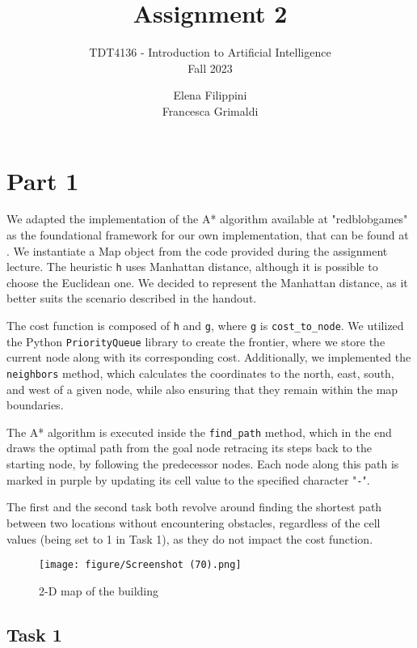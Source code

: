 \documentclass{article}
\title{%
    \huge Assignment 2}
\subtitle{%
    TDT4136 - Introduction to Artificial Intelligence\\
    Fall 2023
    }
\author{%
  Elena Filippini\\
  Francesca Grimaldi
}
\date{}
\begin{document}
\maketitle




\section{Part 1}
    We adapted the implementation of the A* algorithm available at "redblobgames" as the foundational framework for our own implementation, that can be found at \cite{red}.
    We instantiate a Map object from the code provided during the assignment lecture.
    The heuristic \texttt{h} uses Manhattan distance, although it is possible to choose the Euclidean one.
    We decided to represent the Manhattan distance, as it better suits the scenario described in the handout.
    
    The cost function is composed of \texttt{h} and \texttt{g}, where \texttt{g} is \texttt{cost\_to\_node}.
    We utilized the Python \texttt{PriorityQueue} library to create the frontier, where we store the current node along with its corresponding cost. Additionally, we implemented the \texttt{neighbors} method, which calculates the coordinates to the north, east, south, and west of a given node, while also ensuring that they remain within the map boundaries.

    The A* algorithm is executed inside the \texttt{find\_path} method, which in the end draws the optimal path from the goal node retracing its steps back to the starting node, by following the predecessor nodes. Each node along this path is marked in purple by updating its cell value to the specified character "\texttt{-}".

    The first and the second task both revolve around finding the shortest path between two locations without encountering obstacles, regardless of the cell values (being set to 1 in Task 1), as they do not impact the cost function.

    \begin{figure}[H]
    \centering
    \texttt{[image: figure/Screenshot (70).png]}
    \caption{2-D map of the building}
    \label{fig:map1}
    \end{figure}

    
    \subsection{Task 1}
\end{document}
